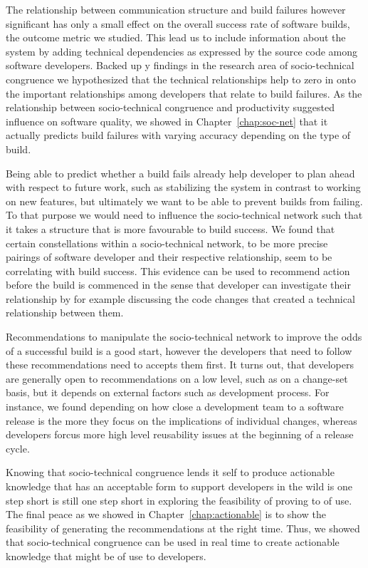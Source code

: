 The relationship between communication structure and build failures however significant has only a small effect on the overall success rate of software builds, the outcome metric we studied.
This lead us to include information about the system by adding technical dependencies as expressed by the source code among software developers.
Backed up y findings in the research area of socio-technical congruence we hypothesized that the technical relationships help to zero in onto the important relationships among developers that relate to build failures.
As the relationship between socio-technical congruence and productivity suggested influence on software quality, we showed in Chapter~\ref{chap:soc-net} that it actually predicts build failures with varying accuracy depending on the type of build.

Being able to predict whether a build fails already help developer to plan ahead with respect to future work, such as stabilizing the system in contrast to working on new features, but ultimately we want to be able to prevent builds from failing.
To that purpose we would need to influence the socio-technical network such that it takes a structure that is more favourable to build success.
We found that certain constellations within a socio-technical network, to be more precise pairings of software developer and their respective relationship, seem to be correlating with build success.
This evidence can be used to recommend action before the build is commenced in the sense that developer can investigate their relationship by for example discussing the code changes that created a technical relationship between them.

Recommendations to manipulate the socio-technical network to improve the odds of a successful build is a good start, however the developers that need to follow these recommendations need to accepts them first.
It turns out, that developers are generally open to recommendations on a low level, such as on a change-set basis, but it depends on external factors such as development process.
For instance, we found depending on how close a development team to a software release is the more they focus on the implications of individual changes, whereas developers forcus more high level reusability issues at the beginning of a release cycle.

Knowing that socio-technical congruence lends it self to produce actionable knowledge that has an acceptable form to support developers in the wild is one step short is still one step short in exploring the feasibility of proving to of use.
The final peace as we showed in Chapter~\ref{chap:actionable} is to show the feasibility of generating the recommendations at the right time.
Thus, we showed that socio-technical congruence can be used in real time to create actionable knowledge that might be of use to developers.

